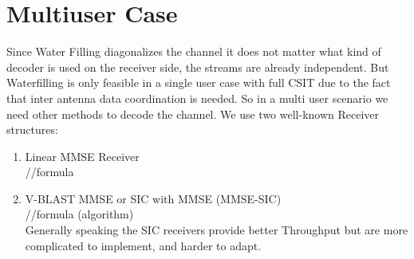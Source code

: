 \section{Multiuser Case}
Since Water Filling diagonalizes the channel it does not matter what kind of decoder is used on the receiver side, the streams are already independent. But Waterfilling is only feasible in a single user case with full CSIT due to the fact that inter antenna data coordination is needed. So in a multi user scenario we need other methods to decode the channel.
We use two well-known Receiver structures:
\begin{enumerate}
	\item Linear MMSE Receiver\\
	//formula
	\item V-BLAST MMSE or SIC with MMSE (MMSE-SIC)\\
	//formula (algorithm)\\
	Generally speaking the SIC receivers provide better Throughput but are more complicated to implement, and harder to adapt.
\end{enumerate}